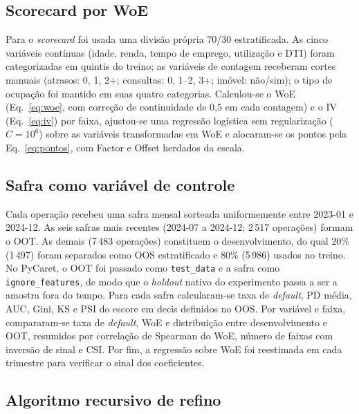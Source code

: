 \documentclass[11pt,a4paper]{article}
\newcommand{\code}[1]{\texttt{#1}}
\begin{document}
\subsection{Scorecard por WoE}
\label{sec:metodo-scorecard}

Para o \emph{scorecard} foi usada uma divisão própria 70/30 estratificada. As cinco variáveis contínuas (idade, renda, tempo de emprego, utilização e DTI) foram categorizadas em quintis do treino; as variáveis de contagem receberam cortes manuais (atrasos: 0, 1, 2+; consultas: 0, 1--2, 3+; imóvel: não/sim); o tipo de ocupação foi mantido em suas quatro categorias. Calculou-se o WoE (Eq.~\ref{eq:woe}, com correção de continuidade de 0{,}5 em cada contagem) e o IV (Eq.~\ref{eq:iv}) por faixa, ajustou-se uma regressão logística sem regularização ($C=10^6$) sobre as variáveis transformadas em WoE e alocaram-se os pontos pela Eq.~\eqref{eq:pontos}, com Factor e Offset herdados da escala.

\subsection{Safra como variável de controle}
\label{sec:metodo-safra}

Cada operação recebeu uma safra mensal sorteada uniformemente entre 2023-01 e 2024-12. As seis safras mais recentes (2024-07 a 2024-12; 2\,517 operações) formam o OOT. As demais (7\,483 operações) constituem o desenvolvimento, do qual 20\% (1\,497) foram separados como OOS estratificado e 80\% (5\,986) usados no treino. No PyCaret, o OOT foi passado como \code{test\_data} e a safra como \code{ignore\_features}, de modo que o \emph{holdout} nativo do experimento passa a ser a amostra fora do tempo. Para cada safra calcularam-se taxa de \emph{default}, PD média, AUC, Gini, KS e PSI do escore em decis definidos no OOS. Por variável e faixa, compararam-se taxa de \emph{default}, WoE e distribuição entre desenvolvimento e OOT, resumidos por correlação de Spearman do WoE, número de faixas com inversão de sinal e CSI. Por fim, a regressão sobre WoE foi reestimada em cada trimestre para verificar o sinal dos coeficientes.

\subsection{Algoritmo recursivo de refino}
\label{sec:refino}
\end{document}
